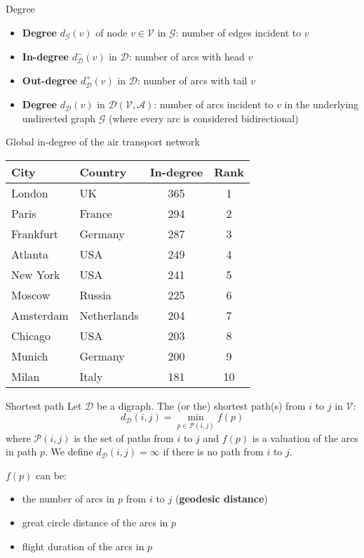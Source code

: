 \documentclass[aspectratio=169]{beamer}\usepackage[]{graphicx}\usepackage[]{xcolor}
\begin{document}
\begin{frame}{Degree}
  \begin{itemize}
    \item \textbf{Degree} $d_\mathcal{G}(v)$ of node $v\in\mathcal{V}$ in $\mathcal{G}$: number of edges incident to $v$
    \item \textbf{In-degree} $d^-_\mathcal{D}(v)$ in $\mathcal{D}$: number of arcs with head $v$
    \item \textbf{Out-degree} $d^+_\mathcal{D}(v)$ in $\mathcal{D}$: number of arcs with tail $v$
    \item \textbf{Degree} $d_\mathcal{D}(v)$ in $\mathcal{D}(\mathcal{V},\mathcal{A})$: number of arcs incident to $v$ in the underlying undirected graph $\mathcal{G}$ (where every arc is considered bidirectional)
  \end{itemize}
\end{frame}

\begin{frame}{Global in-degree of the air transport network}
  \begin{tabular}{l l c c}
    City & Country & In-degree & Rank \\
    \hline
    London & UK & 365 & 1 \\
    Paris & France & 294 & 2 \\
    Frankfurt & Germany & 287 & 3 \\
    Atlanta & USA & 249 & 4 \\
    New York & USA & 241 & 5 \\
    Moscow & Russia & 225 & 6 \\
    Amsterdam & Netherlands & 204 & 7 \\
    Chicago & USA & 203 & 8 \\
    Munich & Germany & 200 & 9 \\
    Milan & Italy & 181 & 10 \\
  \end{tabular}
\end{frame}

\begin{frame}{Shortest path}
  Let $\mathcal{D}$ be a digraph. The (or the) shortest path(s) from $i$ to $j$ in $\mathcal{V}$:
  $$
  d_\mathcal{D}(i,j)=\min_{p\in\mathcal{P}(i,j)} f(p)
  $$
  where $\mathcal{P}(i,j)$ is the set of paths from $i$ to $j$ and $f(p)$ is a valuation of the arcs in path $p$. We define $d_\mathcal{D}(i,j)=\infty$ if there is no path from $i$ to $j$.
  
  $f(p)$ can be:
  \begin{itemize}
    \item the number of arcs in $p$ from $i$ to $j$ (\textbf{geodesic distance})
    \item great circle distance of the arcs in $p$
    \item flight duration of the arcs in $p$
  \end{itemize}
\end{frame}
\end{document}
